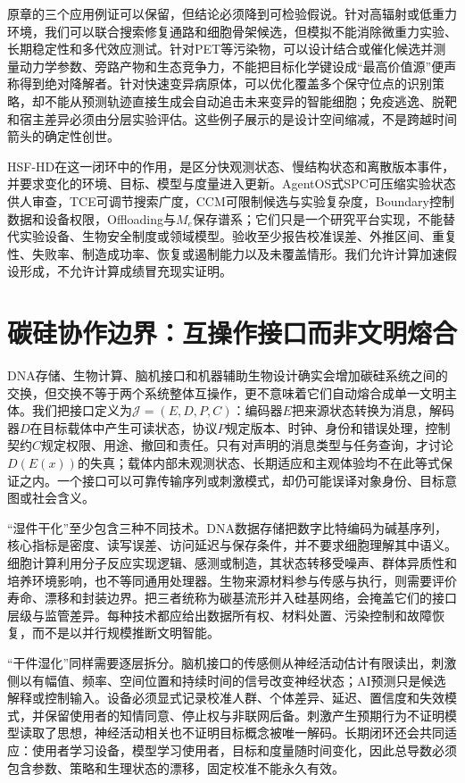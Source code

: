 原章的三个应用例证可以保留，但结论必须降到可检验假说。针对高辐射或低重力环境，我们可以联合搜索修复通路和细胞骨架候选，但模拟不能消除微重力实验、长期稳定性和多代效应测试。针对PET等污染物，可以设计结合或催化候选并测量动力学参数、旁路产物和生态竞争力，不能把目标化学键设成“最高价值源”便声称得到绝对降解者。针对快速变异病原体，可以优化覆盖多个保守位点的识别策略，却不能从预测轨迹直接生成会自动追击未来变异的智能细胞；免疫逃逸、脱靶和宿主差异必须由分层实验评估。这些例子展示的是设计空间缩减，不是跨越时间箭头的确定性创世。

HSF-HD在这一闭环中的作用，是区分快观测状态、慢结构状态和离散版本事件，并要求变化的环境、目标、模型与度量进入更新。AgentOS式SPC可压缩实验状态供人审查，TCE可调节搜索广度，CCM可限制候选与实验复杂度，Boundary控制数据和设备权限，Offloading与$M_e$保存谱系；它们只是一个研究平台实现，不能替代实验设备、生物安全制度或领域模型。验收至少报告校准误差、外推区间、重复性、失败率、制造成功率、恢复或遏制能力以及未覆盖情形。我们允许计算加速假设形成，不允许计算成绩冒充现实证明。

\section{碳硅协作边界：互操作接口而非文明熔合}
\label{sec:fusion_civilization}

DNA存储、生物计算、脑机接口和机器辅助生物设计确实会增加碳硅系统之间的交换，但交换不等于两个系统整体互操作，更不意味着它们自动熔合成单一文明主体。我们把接口定义为$\mathcal{J}=(E,D,P,C)$：编码器$E$把来源状态转换为消息，解码器$D$在目标载体中产生可读状态，协议$P$规定版本、时钟、身份和错误处理，控制契约$C$规定权限、用途、撤回和责任。只有对声明的消息类型与任务查询，才讨论$D(E(x))$的失真；载体内部未观测状态、长期适应和主观体验均不在此等式保证之内。一个接口可以可靠传输序列或刺激模式，却仍可能误译对象身份、目标意图或社会含义。

“湿件干化”至少包含三种不同技术。DNA数据存储把数字比特编码为碱基序列，核心指标是密度、读写误差、访问延迟与保存条件，并不要求细胞理解其中语义。细胞计算利用分子反应实现逻辑、感测或制造，其状态转移受噪声、群体异质性和培养环境影响，也不等同通用处理器。生物来源材料参与传感与执行，则需要评价寿命、漂移和封装边界。把三者统称为碳基流形并入硅基网络，会掩盖它们的接口层级与监管差异。每种技术都应给出数据所有权、材料处置、污染控制和故障恢复，而不是以并行规模推断文明智能。

“干件湿化”同样需要逐层拆分。脑机接口的传感侧从神经活动估计有限读出，刺激侧以有幅值、频率、空间位置和持续时间的信号改变神经状态；AI预测只是候选解释或控制输入。设备必须显式记录校准人群、个体差异、延迟、置信度和失效模式，并保留使用者的知情同意、停止权与非联网后备。刺激产生预期行为不证明模型读取了思想，神经活动相关也不证明目标概念被唯一解码。长期闭环还会共同适应：使用者学习设备，模型学习使用者，目标和度量随时间变化，因此总导数必须包含参数、策略和生理状态的漂移，固定校准不能永久有效。

